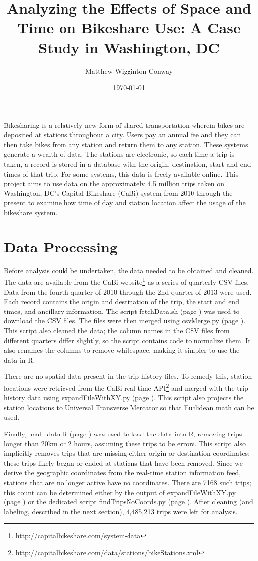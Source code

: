 \documentclass[letterpaper,11pt]{article}
\title{Analyzing the Effects of Space and Time on Bikeshare Use: A Case Study in Washington, DC}
\author{Matthew Wigginton Conway}
\date{\today}
\newcommand{\reflst}[1]{#1 (page \pageref{#1})}
\begin{document}
\fancyhfoffset[E,O]{0pt}
\maketitle

Bikesharing is a relatively new form of shared transportation wherein
bikes are deposited at stations throughout a city. Users pay an annual
fee and they can then take bikes from any station and return them to
any station. These systems generate a wealth of data. The stations are
electronic, so each time a trip is taken, a record is stored in a
database with the origin, destination, start and end times of that
trip. For some systems, this data is freely available online. This
project aims to use data on the approximately 4.5 million trips taken
on Washington, DC's Capital Bikeshare (CaBi) system from 2010 through the
present to examine how time of day and station location affect the
usage of the bikeshare system.

\section{Data Processing}

Before analysis could be undertaken, the data needed to be obtained
and cleaned.  The data are available from the CaBi
website\footnote{\url{http://capitalbikeshare.com/system-data}} as a
series of quarterly CSV files. Data from the fourth quarter of 2010
through the 2nd quarter of 2013 were used. Each record contains the
origin and destination of the trip, the start and end times, and
ancillary information.  The script \reflst{fetchData.sh} was used to
download the CSV files. The files were then merged using
\reflst{csvMerge.py}. This script also cleaned the data; the column
names in the CSV files from different quarters differ slightly, so the script
contains code to normalize them.  It also renames the columns to
remove whitespace, making it simpler to use the data in R.

There are no spatial data present in the trip history files. To remedy
this, station locations were retrieved from the CaBi real-time
API\footnote{\url{http://capitalbikeshare.com/data/stations/bikeStations.xml}}
and merged with the trip history data using
\reflst{expandFileWithXY.py}. This script also projects the station
locations to Universal Transverse Mercator so that Euclidean math can
be used.

Finally, \reflst{load\string_data.R} was used to load the data into R,
removing trips longer than 20km or 2 hours, assuming these trips to be
errors. This script also implicitly removes trips that are missing
either origin or destination coordinates; these trips likely began or
ended at stations that have been removed. Since we derive the
geographic coordinates from the real-time station information feed,
stations that are no longer active have no coordinates. There are 7168
such trips; this count can be determined either by the output of
\reflst{expandFileWithXY.py} or the dedicated script
\reflst{findTripsNoCoords.py}. After cleaning (and labeling, described
in the next section), 4,485,213 trips were left for analysis.
\end{document}
